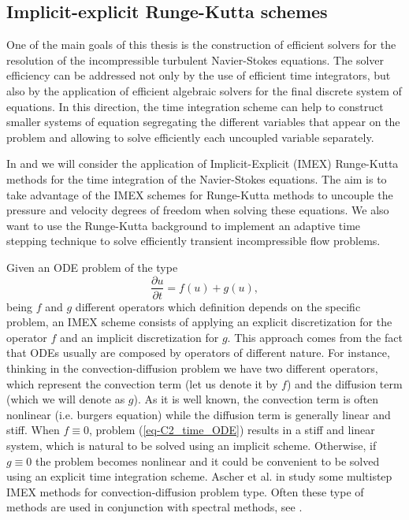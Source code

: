 \subsection{Implicit-explicit Runge-Kutta schemes}
One of the main goals of this thesis is the construction of efficient solvers for the resolution of the incompressible turbulent Navier-Stokes equations. The solver efficiency can be addressed not only by the use of efficient time integrators, but also by the application of efficient algebraic solvers for the final discrete system of equations. In this direction, the time integration scheme can help to construct smaller systems of equation segregating the different variables that appear on the problem and allowing to solve efficiently each uncoupled variable separately.

In  and  we will consider the application of Implicit-Explicit (IMEX) Runge-Kutta methods for the time integration of the Navier-Stokes equations. The aim is to take advantage of the IMEX schemes for Runge-Kutta methods to uncouple the pressure and velocity degrees of freedom when solving these equations. We also want to use the Runge-Kutta background to implement an adaptive time stepping technique to solve efficiently transient incompressible flow problems.

Given an ODE problem of the type
\begin{equation}
\label{eq-C2_time_ODE}
\frac{\partial u}{\partial t}=f(u)+g(u), 
\end{equation}
being $f$ and $g$ different operators which definition depends on the specific problem, an IMEX scheme consists of applying an explicit discretization for the operator $f$ and an implicit discretization for $g$. This approach comes from the fact that ODEs usually are composed by operators of different nature. For instance, thinking in the convection-diffusion problem we have two different operators, which represent the convection term (let us denote it by $f$) and the diffusion term (which we will denote as $g$). As it is well known, the convection term is often nonlinear (i.e. burgers equation) while the diffusion term is generally linear and stiff. When $f\equiv0$, problem (\ref{eq-C2_time_ODE}) results in a stiff and linear system, which is natural to be solved using an implicit scheme. Otherwise, if $g\equiv0$ the problem becomes nonlinear and it could be convenient to be solved using an explicit time integration scheme. Ascher et al. in \cite{ascher_implicit-explicit_1995} study some multistep IMEX methods for convection-diffusion problem type. Often these type of methods are used in conjunction with spectral methods, see \cite{canuto_spectral_1988, kim_application_1985}.

